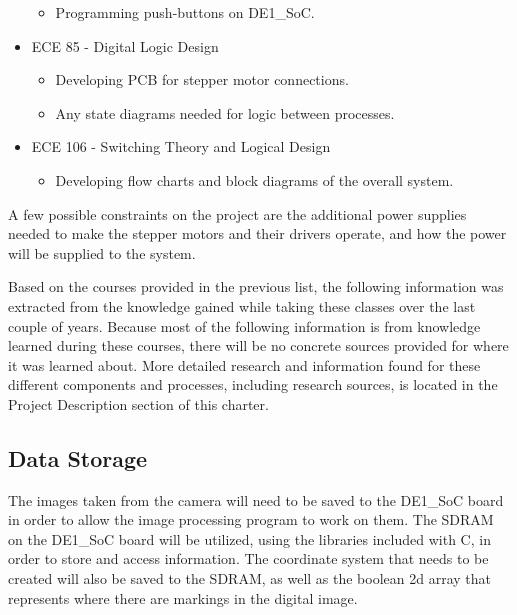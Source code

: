 \begin{itemize}
\begin{itemize}
		\item Programming push-buttons on DE1\_SoC.
	\end{itemize}
	\item ECE 85 - Digital Logic Design
	\begin{itemize}
		\item Developing PCB for stepper motor connections.
		\item Any state diagrams needed for logic between processes.
	\end{itemize}
	\item ECE 106 - Switching Theory and Logical Design
	\begin{itemize}
		\item Developing flow charts and block diagrams of the overall system. \\
	\end{itemize}
\end{itemize}\par

A few possible constraints on the project are the additional power supplies needed to make the stepper motors and their drivers operate, and how the power will be supplied to the system.\par 
Based on the courses provided in the previous list, the following information was extracted from the knowledge gained while taking these classes over the last couple of years. Because most of the following information is from knowledge learned during these courses, there will be no concrete sources provided for where it was learned about. More detailed research and information found for these different components and processes, including research sources, is located in the Project Description section of this charter.

\subsection{Data Storage}
The images taken from the camera will need to be saved to the DE1\_SoC board in order to allow the image processing program to work on them. The SDRAM on the DE1\_SoC board will be utilized, using the libraries included with C, in order to store and access information. The coordinate system that needs to be created will also be saved to the SDRAM, as well as the boolean 2d array that represents where there are markings in the digital image.

